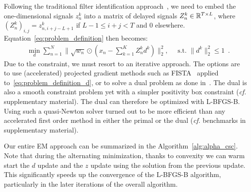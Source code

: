 Following the traditional filter identification approach~\citep{moulines1995subspace}, we need to embed the one-dimensional signals $z_n^k$ into a matrix of delayed signals $Z_n^{k} \in \mathbb{R}^{T \times L}$, where $ (Z_n^{k})_{i,j} = z_{n,i + j - L + 1}^k$ if $ L - 1 \le i+j < T$ and $0$ elsewhere. Equation~\eqref{eq:problem_definition} then becomes:
%
\begin{align}
& \min_{d} \sum_{n=1}^{N} \|\sqrt{w_n} \odot (x_{n} - \sum_{k=1}^{K}Z_{n}^{k}d^{k})\|_{2}^{2}, \quad \text{  s.t.  } \|d^k\|_2^2 \leq 1 \enspace.
\label{eq:problem_definition_d}
\end{align}
%
Due to the constraint, we must resort to an iterative approach. The options are to use (accelerated) projected gradient methods such as FISTA~\citep{beck2009fast} applied to~\eqref{eq:problem_definition_d}, or to solve a dual problem as done in~\cite{Grosse-etal:2007}. The dual is also a smooth constraint problem yet with a simpler positivity box constraint (\textit{cf.} supplementary material). The dual can therefore be optimized with L-BFGS-B. Using such a quasi-Newton solver turned out to be more efficient than any accelerated first order method in either the primal or the dual (\textit{cf.} benchmarks in supplementary material).
%




Our entire \ac{EM} approach can be summarized in the Algorithm~\ref{alg:alpha_csc}.
Note that during the alternating minimization, thanks to convexity we can warm start the $d$ update and the $z$ update using the solution from the previous update. This significantly speeds up the convergence of the L-BFGS-B algorithm, particularly in the later iterations of the overall algorithm.


